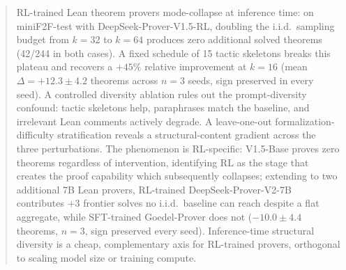 \documentclass{article}
\begin{document}

\printAffiliationsAndNotice{}

\makeatletter
\gdef\@icmltitlerunning{Inference-Time Diversity in Lean Provers}
\makeatother
{}

\begin{abstract}
RL-trained Lean theorem provers mode-collapse at inference time: on miniF2F-test with DeepSeek-Prover-V1.5-RL, doubling the i.i.d.\ sampling budget from $k{=}32$ to $k{=}64$ produces zero additional solved theorems (42/244 in both cases). A fixed schedule of 15 tactic skeletons breaks this plateau and recovers a $+45\%$ relative improvement at $k{=}16$ (mean $\Delta = +12.3 \pm 4.2$ theorems across $n{=}3$ seeds, sign preserved in every seed). A controlled diversity ablation rules out the prompt-diversity confound: tactic skeletons help, paraphrases match the baseline, and irrelevant Lean comments actively degrade. A leave-one-out formalization-difficulty stratification reveals a structural-content gradient across the three perturbations. The phenomenon is RL-specific: V1.5-Base proves zero theorems regardless of intervention, identifying RL as the stage that creates the proof capability which subsequently collapses; extending to two additional 7B Lean provers, RL-trained DeepSeek-Prover-V2-7B contributes $+3$ frontier solves no i.i.d.\ baseline can reach despite a flat aggregate, while SFT-trained Goedel-Prover does not ($-10.0 \pm 4.4$ theorems, $n{=}3$, sign preserved every seed). Inference-time structural diversity is a cheap, complementary axis for RL-trained provers, orthogonal to scaling model size or training compute.
\end{abstract}
\end{document}
